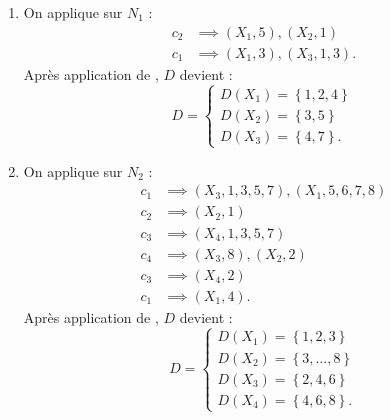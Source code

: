 \begin{td-sol} 
    \begin{enumerate}
        \item On applique  sur \(N_1\) : 
        \begin{equation*}
            \begin{aligned}
                c_2 &\implies (X_1, 5), (X_2, 1) \\
                c_1 &\implies (X_1, 3), (X_3, 1, 3).
            \end{aligned}
        \end{equation*}
        Après application de , \(D\) devient :
        \begin{equation*}
            D = 
            \begin{cases}
                D(X_1) = \left\{1, 2, 4\right\} \\
                D(X_2) = \left\{3, 5\right\} \\
                D(X_3) = \left\{4, 7\right\}.
            \end{cases}
        \end{equation*}

        \item On applique  sur \(N_2\) :
        \begin{equation*}
            \begin{aligned}
                c_1 &\implies (X_3, 1, 3, 5, 7), (X_1, 5, 6, 7, 8) \\
                c_2 &\implies (X_2, 1) \\
                c_3 &\implies (X_4, 1, 3, 5, 7) \\
                c_4 &\implies (X_3, 8), (X_2, 2) \\
                c_3 &\implies (X_4, 2) \\
                c_1 &\implies (X_1, 4).
            \end{aligned}
        \end{equation*}
        Après application de , \(D\) devient :
        \begin{equation*}
            D = 
            \begin{cases}
                D(X_1) = \left\{1, 2, 3\right\} \\
                D(X_2) = \left\{3, \ldots, 8\right\} \\
                D(X_3) = \left\{2, 4, 6\right\} \\
                D(X_4) = \left\{4, 6, 8\right\}.
            \end{cases}
        \end{equation*}


\end{enumerate}
\end{td-sol}
